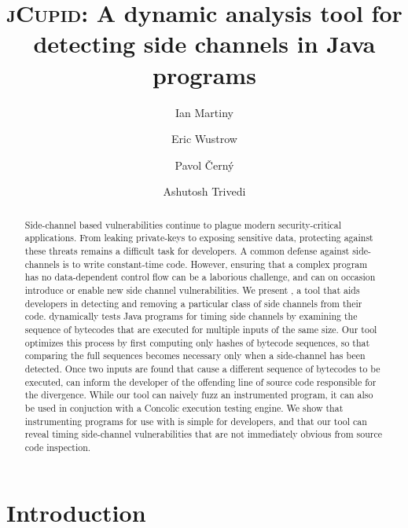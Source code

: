 \documentclass{llncs}
\begin{document}
\title{\textsc{jCupid}: A dynamic analysis tool for detecting side channels in Java programs}
\author{
  Ian Martiny
  \and
  Eric Wustrow
  \and
  Pavol {\v C}ern\'y
  \and
  Ashutosh Trivedi
}


\maketitle

\begin{abstract}
  Side-channel based vulnerabilities continue to plague modern security-critical
  applications.
  From leaking private-keys to exposing sensitive data, 
  protecting against these threats remains a difficult task for developers. 
  A common defense against side-channels is to write constant-time code.
  However, ensuring that a complex program has no data-dependent control flow
  can be a laborious challenge, and can on occasion introduce or enable new side
  channel vulnerabilities.
  We present \jcupid{}, a tool that aids developers in detecting and
  removing a particular class of side channels from their code.
  \jcupid{} dynamically tests Java programs for timing side channels by examining
  the sequence of bytecodes that are executed for multiple inputs of the same size.
  Our tool optimizes this process by first computing only hashes of bytecode sequences,
  so that comparing the full sequences becomes necessary only when a side-channel has been detected.
  Once two inputs are found that cause a different sequence of bytecodes to be
  executed, \jcupid{} can inform the developer of the offending line of source code
  responsible for the divergence.
  While our tool can naively fuzz an instrumented program, it can also be used
  in conjuction with a Concolic execution testing engine.
  We show that instrumenting programs for use with \jcupid{} is simple for
  developers, and that our tool can reveal timing side-channel vulnerabilities
  that are not immediately obvious from source code inspection.
\end{abstract}



\section{Introduction}
\label{sec:introduction}

\end{document}
